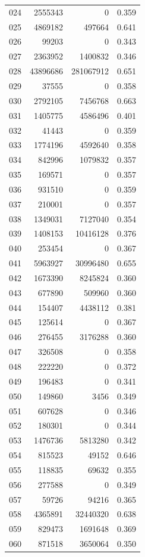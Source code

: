 \documentclass[anonymous,notoc]{gmcm2026}
\begin{document}
\begin{longtable}{lrrr}
024 & 2555343 & 0 & 0.359 \\
025 & 4869182 & 497664 & 0.641 \\
026 & 99203 & 0 & 0.343 \\
027 & 2363952 & 1400832 & 0.346 \\
028 & 43896686 & 281067912 & 0.651 \\
029 & 37555 & 0 & 0.358 \\
030 & 2792105 & 7456768 & 0.663 \\
031 & 1405775 & 4586496 & 0.401 \\
032 & 41443 & 0 & 0.359 \\
033 & 1774196 & 4592640 & 0.358 \\
034 & 842996 & 1079832 & 0.357 \\
035 & 169571 & 0 & 0.357 \\
036 & 931510 & 0 & 0.359 \\
037 & 210001 & 0 & 0.357 \\
038 & 1349031 & 7127040 & 0.354 \\
039 & 1408153 & 10416128 & 0.376 \\
040 & 253454 & 0 & 0.367 \\
041 & 5963927 & 30996480 & 0.655 \\
042 & 1673390 & 8245824 & 0.360 \\
043 & 677890 & 509960 & 0.360 \\
044 & 154407 & 4438112 & 0.381 \\
045 & 125614 & 0 & 0.367 \\
046 & 276455 & 3176288 & 0.360 \\
047 & 326508 & 0 & 0.358 \\
048 & 222220 & 0 & 0.372 \\
049 & 196483 & 0 & 0.341 \\
050 & 149860 & 3456 & 0.349 \\
051 & 607628 & 0 & 0.346 \\
052 & 180301 & 0 & 0.344 \\
053 & 1476736 & 5813280 & 0.342 \\
054 & 815523 & 49152 & 0.646 \\
055 & 118835 & 69632 & 0.355 \\
056 & 277588 & 0 & 0.349 \\
057 & 59726 & 94216 & 0.365 \\
058 & 4365891 & 32440320 & 0.638 \\
059 & 829473 & 1691648 & 0.369 \\
060 & 871518 & 3650064 & 0.350 \\

\end{longtable}
\end{document}
